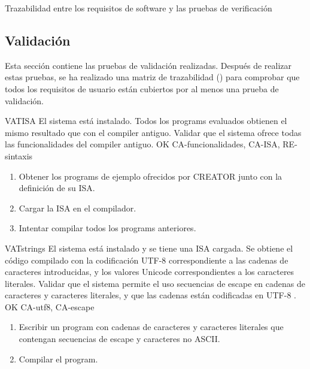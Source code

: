 \begin{landscape}
        {Trazabilidad entre los requisitos de software y las pruebas de verificación}
\end{landscape}

\FloatBarrier

\subsection{Validación}\label{subsec:validation}

Esta sección contiene las pruebas de validación realizadas. Después de realizar
estas pruebas, se ha realizado una matriz de trazabilidad
() para comprobar que todos los requisitos de
usuario están cubiertos por al menos una prueba de validación.

\begin{testCase}{VAT}{ISA}
    {El sistema está instalado.} %
    {Todos los \glspl{program} evaluados obtienen el mismo resultado que con el \gls{compiler} antiguo.} %
    {Validar que el sistema ofrece todas las funcionalidades del \gls{compiler} antiguo.} %
    {OK} %
    {CA-funcionalidades, CA-ISA, RE-sintaxis} %
    \begin{enumerate}[leftmargin=*, topsep=0pt, noitemsep] %
        \item Obtener los \glspl{program} de ejemplo ofrecidos por CREATOR junto con
        la definición de su \gls{ISA}.
        \item Cargar la \gls{ISA} en el compilador.
        \item Intentar compilar todos los \glspl{program} anteriores.
    \end{enumerate}
\end{testCase}

\begin{testCase}{VAT}{strings}
    {El sistema está instalado y se tiene una \gls{ISA} cargada.} %
    {Se obtiene el código compilado con la codificación UTF-8 \parencite{UTF-8}
    correspondiente a las cadenas de caracteres introducidas, y los valores
    Unicode \parencite {UTF-8} correspondientes a los caracteres literales.} %
    {Validar que el sistema permite el uso secuencias de escape en cadenas de
    caracteres y caracteres literales, y que las cadenas están codificadas en
    UTF-8 \parencite{UTF-8}.} %
    {OK} %
    {CA-utf8, CA-escape} %
    \begin{enumerate}[leftmargin=*, topsep=0pt, noitemsep] %
        \item Escribir un \gls{program} con cadenas de caracteres y caracteres
        literales que contengan secuencias de escape y caracteres no ASCII.
        \item Compilar el \gls{program}.
    \end{enumerate}
\end{testCase}


